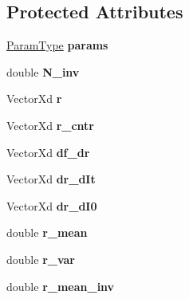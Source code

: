 \subsection*{Protected Attributes}
\begin{DoxyCompactItemize}
\item 
\hypertarget{classRIU_aeb07a51e03b5523d5c28c2047022f4ed}{\hyperlink{structRIUParams}{Param\-Type} {\bfseries params}}\label{classRIU_aeb07a51e03b5523d5c28c2047022f4ed}

\item 
\hypertarget{classRIU_a1e9d4114011bf8c7944afc61bd74bd00}{double {\bfseries N\-\_\-inv}}\label{classRIU_a1e9d4114011bf8c7944afc61bd74bd00}

\item 
\hypertarget{classRIU_ab824b01e3a5e3a52dfdcd50c9184fcc0}{Vector\-Xd {\bfseries r}}\label{classRIU_ab824b01e3a5e3a52dfdcd50c9184fcc0}

\item 
\hypertarget{classRIU_abbaaab243bebe739d1486627ffa670aa}{Vector\-Xd {\bfseries r\-\_\-cntr}}\label{classRIU_abbaaab243bebe739d1486627ffa670aa}

\item 
\hypertarget{classRIU_a68c11e37117ede98714ee13f3512f3b1}{Vector\-Xd {\bfseries df\-\_\-dr}}\label{classRIU_a68c11e37117ede98714ee13f3512f3b1}

\item 
\hypertarget{classRIU_a848180c9131399e7eb513c55037dbb55}{Vector\-Xd {\bfseries dr\-\_\-d\-It}}\label{classRIU_a848180c9131399e7eb513c55037dbb55}

\item 
\hypertarget{classRIU_ad54260e4f9d1c87970396bd2a7ab2610}{Vector\-Xd {\bfseries dr\-\_\-d\-I0}}\label{classRIU_ad54260e4f9d1c87970396bd2a7ab2610}

\item 
\hypertarget{classRIU_a2698f9f2dc4dc2ff129cb7758ab9e369}{double {\bfseries r\-\_\-mean}}\label{classRIU_a2698f9f2dc4dc2ff129cb7758ab9e369}

\item 
\hypertarget{classRIU_adfa49f4abe1b8d7f8da825401a6ab590}{double {\bfseries r\-\_\-var}}\label{classRIU_adfa49f4abe1b8d7f8da825401a6ab590}

\item 
\hypertarget{classRIU_a0f8a3d8f5740d53ccf4e709c9116216f}{double {\bfseries r\-\_\-mean\-\_\-inv}}\label{classRIU_a0f8a3d8f5740d53ccf4e709c9116216f}

\end{DoxyCompactItemize}


